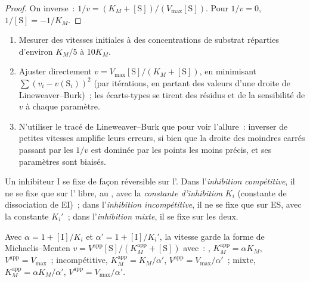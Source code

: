 \begin{proof}
On inverse~: $1/v = (K_M + [\mathrm S])/(V_{\max}[\mathrm S])$. Pour $1/v = 0$, $1/[\mathrm S] = -1/K_M$.
\end{proof}

\begin{method}\label{met:b3:complex-kinetics:mm-fit}
\begin{enumerate}
  \item Mesurer des vitesses initiales à des concentrations de substrat
        réparties d'environ
        $K_M/5$ à $10K_M$.
  \item Ajuster directement $v = V_{\max}[\mathrm S]/(K_M + [\mathrm S])$, en minimisant $\sum(v_i - v(\mathrm S_i))^2$
        (par itérations,
        en partant des valeurs d'une droite de Lineweaver--Burk)~; les
        écarts-types se tirent des résidus et de la sensibilité de $v$ à
        chaque paramètre.
  \item N'utiliser le tracé de Lineweaver--Burk que pour voir l'allure~:
        inverser de petites vitesses amplifie leurs erreurs, si bien que
        la droite des moindres carrés passant par les $1/v$ est dominée
        par les points les moins précis, et ses paramètres sont biaisés.
\end{enumerate}
\end{method}

\begin{definition}[Inhibition]\label{def:b3:complex-kinetics:inhibition}
Un inhibiteur I se fixe de façon réversible sur l'. Dans
l'\emph{inhibition compétitive}, il ne se fixe que sur
l' libre, au , avec la \emph{constante
d'inhibition} $K_i$
(constante de dissociation de EI)~; dans l'\emph{inhibition
incompétitive},
il ne se fixe que sur ES, avec la constante $K_i'$~; dans
l'\emph{inhibition mixte}, il se fixe sur les
deux.
\end{definition}

\begin{proposition}\label{prop:b3:complex-kinetics:inhibition-laws}
Avec $\alpha = 1 + [\mathrm I]/K_i$ et $\alpha' = 1 + [\mathrm I]/K_i'$,
la vitesse garde la forme de Michaelis--Menten
$v = V^{\mathrm{app}}[\mathrm S]/(K_M^{\mathrm{app}} + [\mathrm S])$ avec~:
,
$K_M^{\mathrm{app}} = \alpha K_M$, $V^{\mathrm{app}} = V_{\max}$~;
incompétitive, $K_M^{\mathrm{app}} = K_M/\alpha'$, $V^{\mathrm{app}} =
V_{\max}/\alpha'$~; mixte, $K_M^{\mathrm{app}} = \alpha K_M/\alpha'$, $V^{\mathrm{app}} = V_{\max}/\alpha'$.
\end{proposition}

